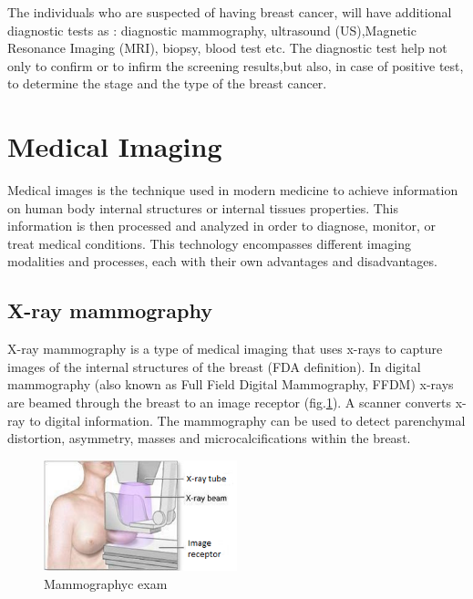 The individuals who are suspected of having breast cancer, will have additional diagnostic tests as : diagnostic mammography, ultrasound (US),Magnetic Resonance Imaging (MRI), biopsy, blood test etc. The diagnostic test help not only to confirm or to infirm the screening results,but also, in case of positive test,  to determine the stage and the type of the breast cancer.
\section{Medical Imaging}\label{section:medicalimaging}
 
Medical images is the technique used in modern medicine to achieve information on human body internal structures or internal tissues properties. This information is then processed and analyzed  in order to diagnose, monitor, or treat medical conditions. This technology  encompasses different imaging modalities and processes, each with their own advantages and disadvantages.

 

\subsection{X-ray mammography}\label{subsection:mammography}

X-ray mammography is a type of medical imaging that uses x-rays to capture images of the internal structures of the breast (FDA  definition). In digital mammography (also known as Full Field Digital Mammography, FFDM) x-rays are beamed through the breast to an image receptor (fig.\ref{fig:mammographyc ecam}). A scanner converts x-ray to digital information. The mammography can be used to detect parenchymal distortion, asymmetry, masses and microcalcifications within the breast. 

	
\begin{figure}[!h]
\centering
\includegraphics[width=0.5\textwidth,keepaspectratio]{figures/xraymammo.PNG} 
\caption[Mammographyc exam]{Mammographyc exam}
\label{fig:mammographyc ecam}
\end{figure} 

